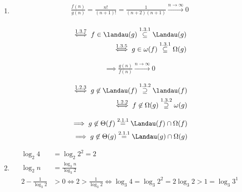 \begin{solution}

\phantom{}


\begin{enumerate}[label = (\alph*)]

  \item

  \begin{align*}
    \frac{f(n)}{g(n)} = \frac{n!}{(n+1)!} = \frac{1}{(n+2)(n+1)} \xrightarrow{n \to \infty} 0 \\
  \end{align*}

  \begin{align*}
    \stackrel{1.3.7}{\iff}
    f \in \landau(g)
    \stackrel{1.3.1}{\subseteq}
    \Landau(g) \\
    \stackrel{1.3.5}{\iff}
    g \in \omega(f)
    \stackrel{1.3.1}{\subseteq}
    \Omega(g)
  \end{align*}

  \begin{align*}
    \implies
    \frac{g(n)}{f(n)} \xrightarrow{n \to \infty} 0
  \end{align*}

  \begin{align*}
    \stackrel{1.2.3}{\iff}
    g \not \in \Landau(f)
    \stackrel{1.3.2}{\supseteq}
    \landau(f) \\
    \stackrel{1.2.2}{\iff}
    f \not \in \Omega(g)
    \stackrel{1.3.2}{\supseteq}
    \omega(g)
  \end{align*}

  \begin{align*}
    \implies
    g \not \in \Theta(f)
    \stackrel{2.1.1}{=}
    \Landau(f) \cap \Omega(f) \\
    \implies
    g \not \in \Theta(g)
    \stackrel{2.1.1}{=}
    \Landau(g) \cap \Omega(g)
  \end{align*}

  \item

  \begin{align*}
    \log_2{4}               & = \log_2{2^2} = 2 \\
    \log_2{n}               & = \frac{\log_3{n}}{\log_3{2}} \\
    2 - \frac{1}{\log_3{2}} & > 0 \iff 2 > \frac{1}{\log_3{2}} \iff \log_3{4} = \log_3{2^2} = 2 \log_3{2} > 1 = \log_3{3^1}
  \end{align*}


\end{enumerate}
\end{solution}
